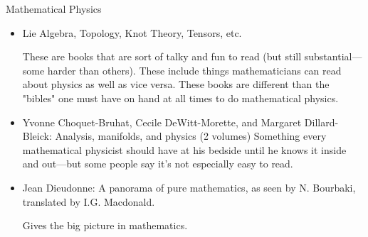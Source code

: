 \documentclass[10pt,a4paper]{book}
\theoremstyle{definition}
\begin{document}
Mathematical Physics
\begin{itemize}
\item 
Lie Algebra, Topology, Knot Theory, Tensors, etc.

These are books that are sort of talky and fun to read (but still substantial—some harder than others).  These include things mathematicians can read about physics as well as vice versa.  These books are different than the "bibles" one must have on hand at all times to do mathematical physics.

\item Yvonne Choquet-Bruhat, Cecile DeWitt-Morette, and Margaret Dillard-Bleick: Analysis, manifolds, and physics (2 volumes)
Something every mathematical physicist should have at his bedside until he knows it inside and out—but some people say it's not especially easy to read.
\item Jean Dieudonne: A panorama of pure mathematics, as seen by N. Bourbaki, translated by I.G. Macdonald.

Gives the big picture in mathematics.


\end{itemize}
\end{document}
